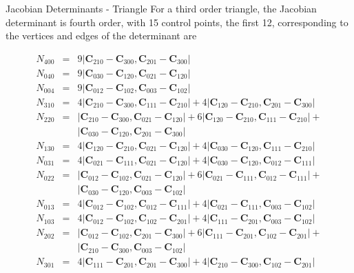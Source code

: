 \documentclass[12pt]{beamer}
\begin{document}
\begin{frame}{Jacobian Determinants - Triangle}
For a third order triangle, the Jacobian determinant is fourth order, with 15 control points, the first 12, corresponding to the vertices and edges of the determinant are
{
  \scriptsize

\begin{eqnarray*}
N_{400}&=&9\left|\mathbf{C}_{210}-\mathbf{C}_{300},\mathbf{C}_{201}-\mathbf{C}_{300}\right|
\\N_{040}&=&9\left|\mathbf{C}_{030}-\mathbf{C}_{120},\mathbf{C}_{021}-\mathbf{C}_{120}\right|
\\N_{004}&=&9\left|\mathbf{C}_{012}-\mathbf{C}_{102},\mathbf{C}_{003}-\mathbf{C}_{102}\right|
\\N_{310}&=&4\left|\mathbf{C}_{210}-\mathbf{C}_{300},\mathbf{C}_{111}-\mathbf{C}_{210}\right|+4\left|\mathbf{C}_{120}-\mathbf{C}_{210},\mathbf{C}_{201}-\mathbf{C}_{300}\right|
\\N_{220}&=&\left|\mathbf{C}_{210}-\mathbf{C}_{300},\mathbf{C}_{021}-\mathbf{C}_{120}\right|+6\left|\mathbf{C}_{120}-\mathbf{C}_{210},\mathbf{C}_{111}-\mathbf{C}_{210}\right|+\\&&\left|\mathbf{C}_{030}-\mathbf{C}_{120},\mathbf{C}_{201}-\mathbf{C}_{300}\right|
\\N_{130}&=&4\left|\mathbf{C}_{120}-\mathbf{C}_{210},\mathbf{C}_{021}-\mathbf{C}_{120}\right|+4\left|\mathbf{C}_{030}-\mathbf{C}_{120},\mathbf{C}_{111}-\mathbf{C}_{210}\right|
\\N_{031}&=&4\left|\mathbf{C}_{021}-\mathbf{C}_{111},\mathbf{C}_{021}-\mathbf{C}_{120}\right|+4\left|\mathbf{C}_{030}-\mathbf{C}_{120},\mathbf{C}_{012}-\mathbf{C}_{111}\right|
\\N_{022}&=&\left|\mathbf{C}_{012}-\mathbf{C}_{102},\mathbf{C}_{021}-\mathbf{C}_{120}\right|+6\left|\mathbf{C}_{021}-\mathbf{C}_{111},\mathbf{C}_{012}-\mathbf{C}_{111}\right|+\\&&\left|\mathbf{C}_{030}-\mathbf{C}_{120},\mathbf{C}_{003}-\mathbf{C}_{102}\right|
\\N_{013}&=&4\left|\mathbf{C}_{012}-\mathbf{C}_{102},\mathbf{C}_{012}-\mathbf{C}_{111}\right|+4\left|\mathbf{C}_{021}-\mathbf{C}_{111},\mathbf{C}_{003}-\mathbf{C}_{102}\right|
\\N_{103}&=&4\left|\mathbf{C}_{012}-\mathbf{C}_{102},\mathbf{C}_{102}-\mathbf{C}_{201}\right|+4\left|\mathbf{C}_{111}-\mathbf{C}_{201},\mathbf{C}_{003}-\mathbf{C}_{102}\right|
\\N_{202}&=&\left|\mathbf{C}_{012}-\mathbf{C}_{102},\mathbf{C}_{201}-\mathbf{C}_{300}\right|+6\left|\mathbf{C}_{111}-\mathbf{C}_{201},\mathbf{C}_{102}-\mathbf{C}_{201}\right|+\\&&\left|\mathbf{C}_{210}-\mathbf{C}_{300},\mathbf{C}_{003}-\mathbf{C}_{102}\right|
\\N_{301}&=&4\left|\mathbf{C}_{111}-\mathbf{C}_{201},\mathbf{C}_{201}-\mathbf{C}_{300}\right|+4\left|\mathbf{C}_{210}-\mathbf{C}_{300},\mathbf{C}_{102}-\mathbf{C}_{201}\right|
\end{eqnarray*}
}
\end{frame}
\end{document}
